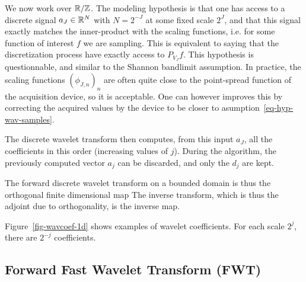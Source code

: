 We now work over $\mathbb{R}/\mathbb{Z}$.
%
The modeling hypothesis is that one has access to a discrete signal $a_J \in \mathbb{R}^N$ with $N = 2^{-J}$ at some fixed scale $2^J$, and that this signal exactly matches the inner-product with the scaling functions, i.e.
for some function of interest $f$ we are sampling. This is equivalent to saying that the discretization process have exactly access to $P_{V_J}f$. This hypothesis is questionnable, and similar to the Shannon bandlimit assumption. In practice, the scaling functions $(\phi_{J,n})_n$ are often quite close to the point-spread function of the acquisition device, so it is acceptable. One can however improves this by correcting the acquired values by the device to be closer to asumption~\eqref{eq-hyp-wav-samples}.

The discrete wavelet transform then computes, from this input $a_J$, all the coefficients 
in this order (increasing values of $j$). During the algorithm, the previously computed vector $a_j$ can be discarded, and only the $d_j$ are kept. 

The forward discrete wavelet transform on a bounded domain is thus the orthogonal finite dimensional map
The inverse transform, which is thus the adjoint due to orthogonality, is the inverse map.


Figure~\ref{fig-wavcoef-1d} shows examples of wavelet coefficients. For each scale $2^j$, there are $2^{-j}$ coefficients.



\subsection{Forward Fast Wavelet Transform (FWT)}

